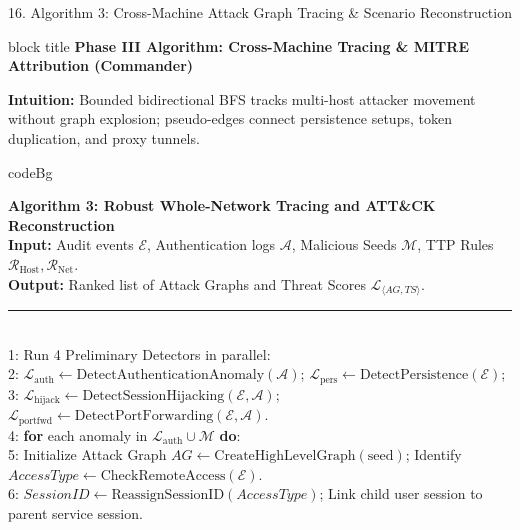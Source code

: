 \documentclass[aspectratio=169,10pt]{beamer}
\begin{document}
\begin{frame}{16. Algorithm 3: Cross-Machine Attack Graph Tracing \& Scenario Reconstruction}
\vspace{-0.30em}
\begin{beamercolorbox}[rounded=true,shadow=false,sep=0.25em,wd=\textwidth]{block title}
\textbf{\scriptsize Phase III Algorithm: Cross-Machine Tracing \& MITRE Attribution (Commander)}
\end{beamercolorbox}
\vspace{0.08em}
{\fontsize{6.0pt}{7.5pt}\selectfont
\textbf{Intuition:} Bounded bidirectional BFS tracks multi-host attacker movement without graph explosion; pseudo-edges connect persistence setups, token duplication, and proxy tunnels.
}
\vspace{0.10em}
\centering
\begin{beamercolorbox}[rounded=true,shadow=false,sep=0.20em,wd=0.98\textwidth]{codeBg}
{\fontsize{4.8pt}{5.8pt}\selectfont\ttfamily
\textbf{Algorithm 3: Robust Whole-Network Tracing and ATT\&CK Reconstruction}\\
\textbf{Input:} Audit events $\mathcal{E}$, Authentication logs $\mathcal{A}$, Malicious Seeds $\mathcal{M}$, TTP Rules $\mathcal{R}_{\text{Host}}, \mathcal{R}_{\text{Net}}$.\\
\textbf{Output:} Ranked list of Attack Graphs and Threat Scores $\mathcal{L}_{\langle AG, TS \rangle}$.\\[0.03cm]
\rule{\linewidth}{0.3pt}\\[0.03cm]
1: Run 4 Preliminary Detectors in parallel:\\
2: \quad $\mathcal{L}_{\text{auth}} \leftarrow \text{DetectAuthenticationAnomaly}(\mathcal{A})$; \quad $\mathcal{L}_{\text{pers}} \leftarrow \text{DetectPersistence}(\mathcal{E})$;\\
3: \quad $\mathcal{L}_{\text{hijack}} \leftarrow \text{DetectSessionHijacking}(\mathcal{E}, \mathcal{A})$; \quad $\mathcal{L}_{\text{portfwd}} \leftarrow \text{DetectPortForwarding}(\mathcal{E}, \mathcal{A})$.\\
4: \textbf{for} each anomaly in $\mathcal{L}_{\text{auth}} \cup \mathcal{M}$ \textbf{do}:\\
5: \quad Initialize Attack Graph $AG \leftarrow \text{CreateHighLevelGraph}(\text{seed})$; Identify $AccessType \leftarrow \text{CheckRemoteAccess}(\mathcal{E})$.\\
6: \quad $SessionID \leftarrow \text{ReassignSessionID}(AccessType)$; Link child user session to parent service session.\\
}
\end{beamercolorbox}
\end{frame}
\end{document}
